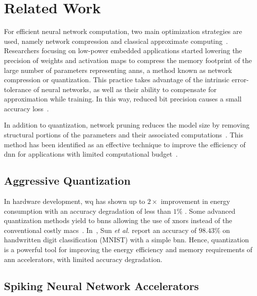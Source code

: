 \section{Related Work}
For efficient neural network computation, two main optimization strategies are used, namely network compression and classical approximate computing~\cite{bouvier2019spiking}. Researchers focusing on low-power embedded applications started lowering the precision of weights and activation maps to compress the memory footprint of the large number of parameters representing \glspl{ann}, a method known as network compression or quantization. This practice takes advantage of the intrinsic error-tolerance of neural networks, as well as their ability to compensate for approximation while training. In this way, reduced bit precision causes a small accuracy loss~\cite{courbariaux2015binaryconnect, han2015deep, hubara2017quantized, rastegari2016xnor}.


In addition to quantization, network pruning reduces the model size by removing structural portions of the parameters and their associated computations~\cite{lecun1989optimal,hassibi1992second}. This method has been identified as an effective technique to improve the efficiency of \gls{dnn} for applications with limited computational budget~\cite{molchanov2016pruning,li2016pruning, liu2018rethinking}.


\subsection{Aggressive Quantization}
In hardware development, \gls{wq} has shown up to $2\times$ improvement in energy consumption with an accuracy degradation of less than $1\%$ \cite{moons20160, whatmough201714}. Some advanced quantization methods yield to \glspl{bnn} allowing the use of \glspl{xnor} instead of the conventional costly \glspl{mac}~\cite{rastegari2016xnor}. In~\cite{sun2018xnor}, Sun \textit{et al.} report an accuracy of $98.43\%$ on handwritten digit classification (MNIST) with a simple \gls{bnn}. Hence, quantization is a powerful tool for improving the energy efficiency and memory requirements of \gls{ann} accelerators, with limited accuracy degradation.

\subsection{Spiking Neural Network Accelerators}

